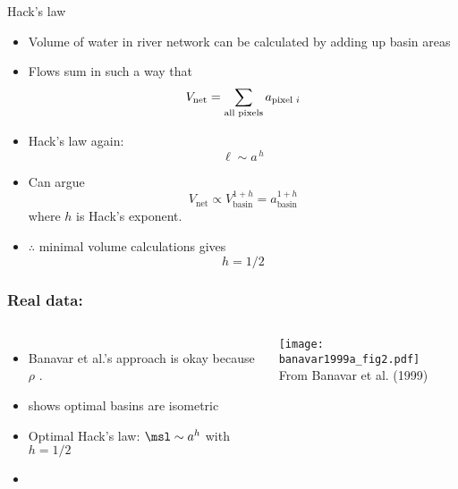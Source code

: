 


\begin{frame}

  \begin{block}{Hack's law}
  \begin{itemize}
  \item<1-> Volume of water in river network can be calculated 
    by adding up basin areas
  \item<2-> Flows sum in such a way that 
    $$ V_{\textrm{net}} = \sum_{\mbox{\scriptsize all pixels}} a_{\mbox{\scriptsize pixel $i$}} $$
  \item<3-> Hack's law again:
    $$
    \ell \sim a^{\, h}
    $$
  \item<4-> 
    Can argue     
    $$ V_{\textrm{net}} \propto V_{\textrm{basin}}^{1+h} = a_{\textrm{basin}}^{1+h}$$
    where 
    $h$ is Hack's exponent.
  \item<5-> 
    $\therefore$ minimal volume calculations gives 
    $$
    \boxed{
      h=1/2
    }
    $$
  \end{itemize}
  \end{block}

\end{frame}

\begin{frame}
  \frametitle{Real data:}

  \begin{block}{}
  \begin{columns}
    \begin{itemize}
    \item<1-> Banavar et al.'s approach\cite{banavar1999a} is okay 
      because $\rho$ .
    \item<3->  shows optimal basins are isometric
    \item<4-> Optimal Hack's law: $\msl \sim a^{h}$ with
      $h=1/2$ 
    \item<5-> 
    \end{itemize}
    \begin{overprint}
      \texttt{[image: banavar1999a\_fig2.pdf]}\\
      {\small From Banavar et al. (1999)\cite{banavar1999a}}
    \end{overprint}
  \end{columns}
  \end{block}

\end{frame}

